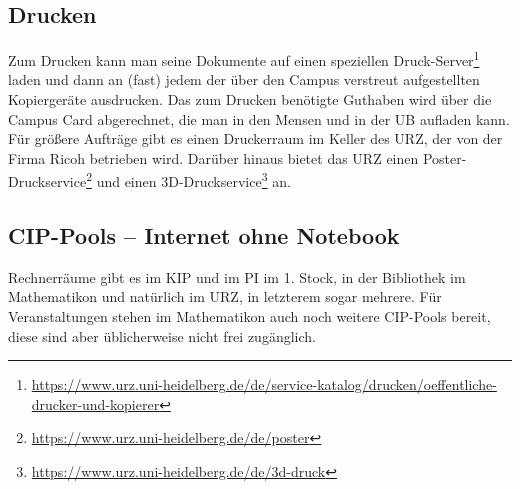 
\vspace*{-2mm}
\subsection{Drucken}
\vspace*{-1mm}
Zum Drucken kann man seine Dokumente auf einen speziellen Druck-Server\footnote{\url{https://www.urz.uni-heidelberg.de/de/service-katalog/drucken/oeffentliche-drucker-und-kopierer}} laden und dann an (fast) jedem der über den Campus verstreut aufgestellten Kopiergeräte ausdrucken. Das zum Drucken benötigte Gut\-ha\-ben wird über die Campus Card abgerechnet, die man in den Mensen und in der \gls{UB} aufladen kann. Für größere Aufträge gibt es einen Druckerraum im Keller des \gls{URZ}, der von der Firma Ricoh betrieben wird. Darüber hinaus bietet das URZ einen Poster-Druckservice\footnote{\url{https://www.urz.uni-heidelberg.de/de/poster}} und einen 3D-Druckservice\footnote{\url{https://www.urz.uni-heidelberg.de/de/3d-druck}} an.

\vspace*{-2mm}
\subsection{CIP-Pools -- Internet ohne Notebook}
\vspace*{-1mm}
Rechnerräume gibt es im \gls{KIP} und im \gls{PI} im 1. Stock, in der Bibliothek im \gls{Mathematikon} und natürlich im \gls{URZ}, in letzterem sogar mehrere. Für Veranstaltungen stehen im Mathematikon auch noch weitere CIP-Pools bereit, diese sind aber üblicherweise nicht frei zugänglich.

